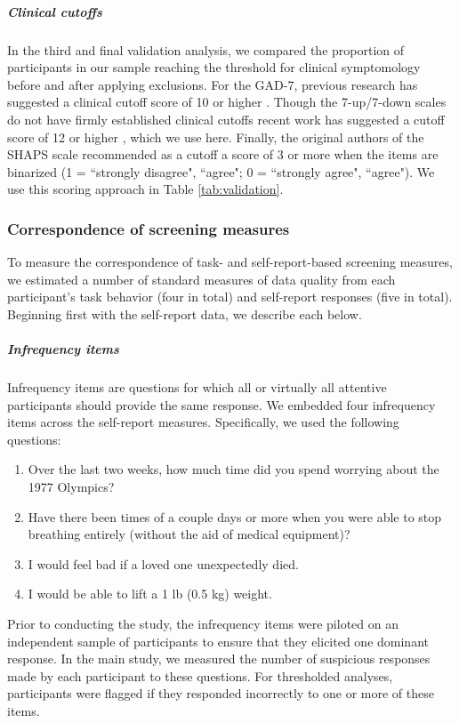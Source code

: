 \documentclass[a4paper,notitlepage,12pt]{article}
\begin{document}
\subparagraph{Clinical cutoffs} In the third and final validation analysis, we compared the proportion of participants in our sample reaching the threshold for clinical symptomology before and after applying exclusions. For the GAD-7, previous research has suggested a clinical cutoff score of 10 or higher \cite{lowe2008validation, hinz2017psychometric}. Though the 7-up/7-down scales do not have firmly established clinical cutoffs recent work has suggested a cutoff score of 12 or higher \cite{youngstrom2020evaluating}, which we use here. Finally, the original authors of the SHAPS scale recommended as a cutoff a score of 3 or more when the items are binarized (1 = ``strongly disagree", ``agree"; 0 = ``strongly agree", ``agree"). We use this scoring approach in Table \ref{tab:validation}.   

\subsubsection{Correspondence of screening measures}

To measure the correspondence of task- and self-report-based screening measures, we estimated a number of standard measures of data quality from each participant's task behavior (four in total) and self-report responses (five in total). Beginning first with the self-report data, we describe each below.

\subparagraph{Infrequency items} 

Infrequency items are questions for which all or virtually all attentive participants should provide the same response. We embedded four infrequency items across the self-report measures. Specifically, we used the following questions:

\begin{enumerate}
  \item Over the last two weeks, how much time did you spend worrying about the 1977 Olympics? 
  \item Have there been times of a couple days or more when you were able to stop breathing entirely (without the aid of medical equipment)?
  \item I would feel bad if a loved one unexpectedly died.
  \item I would be able to lift a 1 lb (0.5 kg) weight.
\end{enumerate}

Prior to conducting the study, the infrequency items were piloted on an independent sample of participants to ensure that they elicited one dominant response. In the main study, we measured the number of suspicious responses made by each participant to these questions. For thresholded analyses, participants were flagged if they responded incorrectly to one or more of these items.
\end{document}
